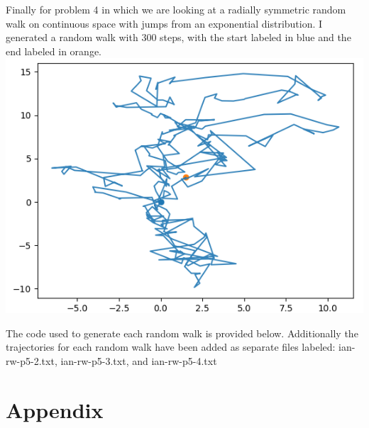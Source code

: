 \documentclass[12pt]{amsart}
\theoremstyle{definition}
\begin{document}
\begin{itemize}
Finally for problem 4 in which we are looking at a radially symmetric random walk on continuous space with jumps from an exponential distribution. I generated a random walk with $300$ steps, with the start labeled in blue and the end labeled in orange.\\
\includegraphics[scale=.5]{rw-p5p4.png}

The code used to generate each random walk is provided below. Additionally the trajectories for each random walk have been added as separate files labeled: ian-rw-p5-2.txt, ian-rw-p5-3.txt, and ian-rw-p5-4.txt

\newpage
\section*{Appendix}









\end{itemize}
\end{document}
